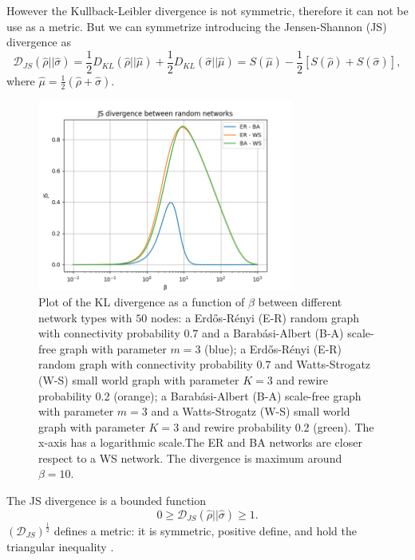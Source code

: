 However the Kullback-Leibler divergence is not symmetric, therefore it can not be use as a metric. 
But we can symmetrize introducing the Jensen-Shannon (JS) divergence \cite{J-S_divergence} as
\begin{equation}\label{JS_metric}
    \mathcal{D}_{JS}(\hat\rho||\hat\sigma) =  \frac{1}{2}D_{KL}(\hat \rho || \hat \mu) + \frac{1}{2}D_{KL}(\hat \sigma || \hat \mu) = S(\hat\mu)-\frac{1}{2}\left[S(\hat\rho) + S(\hat\sigma)\right],
\end{equation}
where $\hat\mu =\frac{1}{2}(\hat\rho+\hat\sigma)$. 
\begin{figure}[ht!]
    \centering
    \includegraphics[width=0.75\textwidth]{image/JS_divergence.png}
    \caption{Plot of the KL divergence as a function of $\beta$ between different network types with $50$ nodes: a Erd\H{o}s-Rényi (E-R) random graph with connectivity probability $0.7$ and a Barab\'asi-Albert (B-A) scale-free graph with parameter $m=3$ (blue); a Erd\H{o}s-Rényi (E-R) random graph with connectivity probability $0.7$ and Watts-Strogatz (W-S) small world graph with parameter $K=3$ and rewire probability 0.2 (orange); a Barab\'asi-Albert (B-A) scale-free graph with parameter $m=3$ and a Watts-Strogatz (W-S) small world graph with parameter $K=3$ and rewire probability 0.2 (green). The x-axis has a logarithmic scale.The ER and BA networks are closer respect to a WS network. The divergence is maximum around $\beta = 10$.}
    \label{Fig:JS_divergence}
\end{figure}

The JS divergence is a bounded function \cite{J-S_divergence}
\begin{equation}
    0 \geq \mathcal{D}_{JS}(\hat\rho||\hat\sigma) \geq 1.
\end{equation}
$\left(\mathcal{D}_{JS}\right)^{\frac{1}{2}}$ defines a metric: it is symmetric, positive define, and hold the triangular inequality \cite{Jensen-Shannon_divergence}. 

